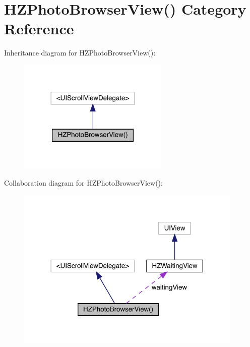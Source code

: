 \hypertarget{category_h_z_photo_browser_view_07_08}{}\section{H\+Z\+Photo\+Browser\+View() Category Reference}
\label{category_h_z_photo_browser_view_07_08}


Inheritance diagram for H\+Z\+Photo\+Browser\+View()\+:\nopagebreak
\begin{figure}[H]
\begin{center}
\leavevmode
\includegraphics[width=204pt]{category_h_z_photo_browser_view_07_08__inherit__graph}
\end{center}
\end{figure}


Collaboration diagram for H\+Z\+Photo\+Browser\+View()\+:\nopagebreak
\begin{figure}[H]
\begin{center}
\leavevmode
\includegraphics[width=306pt]{category_h_z_photo_browser_view_07_08__coll__graph}
\end{center}
\end{figure}
